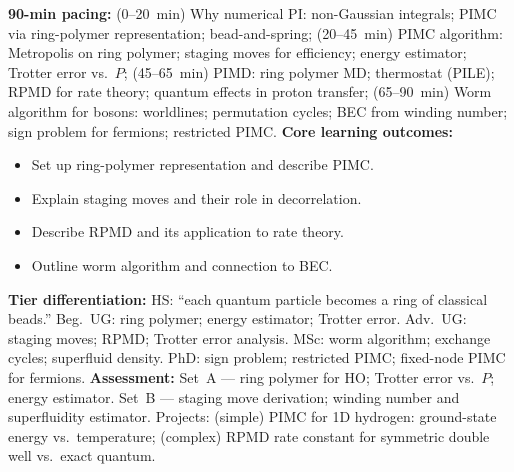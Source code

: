 \documentclass[11pt,a4paper]{article}
\begin{document}
\begin{tcolorbox}[modulebox, title={Module~II.2 --- Lecture L11: Numerical Path Integrals}]
\textbf{90-min pacing:} (0--20~min) Why numerical PI: non-Gaussian integrals; PIMC via ring-polymer representation; bead-and-spring; (20--45~min) PIMC algorithm: Metropolis on ring polymer; staging moves for efficiency; energy estimator; Trotter error vs.\ $P$; (45--65~min) PIMD: ring polymer MD; thermostat (PILE); RPMD for rate theory; quantum effects in proton transfer; (65--90~min) Worm algorithm for bosons: worldlines; permutation cycles; BEC from winding number; sign problem for fermions; restricted PIMC.
\medskip\textbf{Core learning outcomes:}
\begin{itemize}[leftmargin=1.4em,topsep=2pt,itemsep=1pt]
  \item Set up ring-polymer representation and describe PIMC.
  \item Explain staging moves and their role in decorrelation.
  \item Describe RPMD and its application to rate theory.
  \item Outline worm algorithm and connection to BEC.
\end{itemize}
\medskip\textbf{Tier differentiation:}
HS: ``each quantum particle becomes a ring of classical beads.''
Beg.\ UG: ring polymer; energy estimator; Trotter error.
Adv.\ UG: staging moves; RPMD; Trotter error analysis.
MSc: worm algorithm; exchange cycles; superfluid density.
PhD: sign problem; restricted PIMC; fixed-node PIMC for fermions.
\medskip\textbf{Assessment:}
Set~A --- ring polymer for HO; Trotter error vs.\ $P$; energy estimator.
Set~B --- staging move derivation; winding number and superfluidity estimator.
Projects: (simple) PIMC for 1D hydrogen: ground-state energy vs.\ temperature; (complex) RPMD rate constant for symmetric double well vs.\ exact quantum.
\end{tcolorbox}

\medskip
\end{document}
